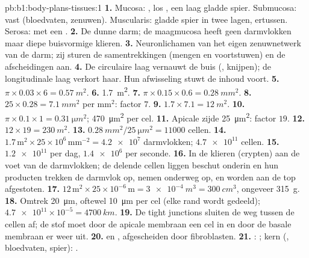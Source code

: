 \begin{solution}{pb:b1:body-plans-tissues:1}
\textbf{1.} Mucosa: , los , een laag gladde spier.
Submucosa: vast  (bloedvaten, zenuwen). Muscularis: gladde spier in twee
lagen,  ertussen. Serosa:  met een .
\textbf{2.} De dunne darm; de maagmucosa heeft geen darmvlokken maar diepe
buisvormige klieren.
\textbf{3.} Neuronlichamen van het eigen zenuwnetwerk van de darm; zij sturen
de samentrekkingen (mengen en voortstuwen) en de afscheidingen aan.
\textbf{4.} De circulaire laag vernauwt de buis (, knijpen); de
longitudinale laag verkort haar. Hun afwisseling stuwt de inhoud voort.
\textbf{5.} $\pi\times 0.03\times 6 = \qty{0.57}{m^2}$.
\textbf{6.} \qty{1.7}{m^2}.
\textbf{7.} $\pi\times 0.15\times 0.6 = \qty{0.28}{mm^2}$.
\textbf{8.} $25\times 0.28 = \qty{7.1}{mm^2}$ per mm$^2$: factor $7$.
\textbf{9.} $1.7\times 7.1 = \qty{12}{m^2}$.
\textbf{10.} $\pi\times 0.1\times 1 = \qty{0.31}{\micro m^2}$;
\qty{470}{\micro m^2} per cel.
\textbf{11.} Apicale zijde \qty{25}{\micro m^2}: factor $19$.
\textbf{12.} $12\times 19 = \qty{230}{m^2}$.
\textbf{13.} $\qty{0.28}{mm^2}/\qty{25}{\micro m^2} = \num{11000}$ cellen.
\textbf{14.} $1.7\,\mathrm{m^2}\times 25\times 10^6\,\mathrm{mm^{-2}} =
\num{4.2e7}$ darmvlokken; $\num{4.7e11}$ cellen.
\textbf{15.} $\num{1.2e11}$ per dag, $\num{1.4e6}$ per seconde.
\textbf{16.} In de klieren (crypten) aan de voet van de darmvlokken; de delende
cellen liggen beschut onderin en hun producten trekken de darmvlok op, nemen
onderweg op, en worden aan de top afgestoten.
\textbf{17.} $12\,\mathrm{m^2}\times 25\times 10^{-6}\,\mathrm{m} =
\qty{3e-4}{m^3} = \qty{300}{cm^3}$, ongeveer \qty{315}{g}.
\textbf{18.} Omtrek \qty{20}{\micro m}, oftewel \qty{10}{\micro m} per cel
(elke rand wordt gedeeld); $\num{4.7e11}\times 10^{-5} = \qty{4700}{km}$.
\textbf{19.} De tight junctions sluiten de weg tussen de cellen af; de stof moet
door de apicale membraan een cel in en door de basale membraan er weer uit.
\textbf{20.}  en , afgescheiden door fibroblasten.
\textbf{21.} : ; kern (, bloedvaten, spier): .

\end{solution}
